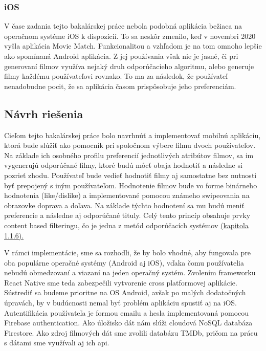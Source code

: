 \subsubsection{iOS}
V čase zadania tejto bakalárskej práce nebola podobná aplikácia bežiaca na operačnom systéme iOS k dispozícií. To sa neskôr zmenilo, keď v novembri 2020 vyšla aplikácia Movie Match. Funkcionalitou a vzhľadom je na tom omnoho lepšie ako spomínaná Android aplikácia. Z jej používania však nie je jasné, či pri generovaní filmov využíva nejaký druh odporúčacieho algoritmu, alebo generuje filmy každému používateľovi rovnako. To ma za následok, že  používateľ nenadobudne pocit, že sa aplikácia časom prispôsobuje jeho preferenciám. 


\subsection{Návrh riešenia}
Cieľom tejto bakalárskej práce bolo navrhnúť a implementovať mobilnú aplikáciu, ktorá bude slúžiť ako pomocník pri spoločnom výbere filmu dvoch používateľov. Na základe ich osobného profilu preferencií jednotlivých atribútov filmov, sa im vygenerujú odporúčané filmy, ktoré budú môcť obaja hodnotiť a následne si pozrieť zhodu. Používateľ bude vedieť hodnotiť filmy aj samostatne bez nutnosti byť prepojený s iným používateľom. Hodnotenie filmov bude vo forme binárneho hodnotenia (like/dislike) a implementované pomocou známeho swipeovania na obrazovke doprava a doľava. Na základe týchto hodnotení sa mu budú meniť preferencie a následne aj odporúčané tituly. Celý tento princíp obsahuje prvky content based filteringu, čo je jedna z metód odporúčacích systémov \hyperref[sec:contentbased]{(kapitola 1.1.6).}

V rámci implementácie, sme sa rozhodli, že by bolo vhodné, aby fungovala pre oba populárne operačné systémy (Android aj iOS), vďaka čomu používatelia nebudú obmedzovaní a viazaní na jeden operačný systém. Zvolením frameworku React Native sme teda zabezpečili vytvorenie cross platformovej aplikácie. Sústrediť sa budeme prioritne na OS Android, avšak po malých dodatočných úpravách, by v budúcnosti nemal byť problém aplikáciu spustiť aj na iOS. Autentifikácia používateľa je formou emailu a hesla implementovaná pomocou Firebase authentication. Ako úložisko dát nám slúži cloudová NoSQL databáza Firestore. Ako zdroj filmových dát sme zvolili databázu TMDb, pričom na prácu s dátami sme využívali aj ich \acrshort{api}. 
\vspace{55mm} %


